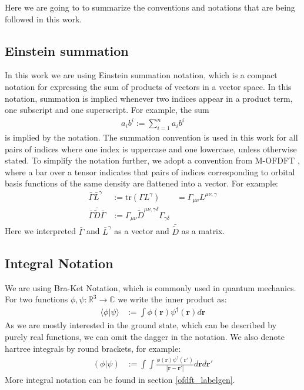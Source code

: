 Here we are going to to summarize the conventions and notations that are being followed in this work.
\subsection{Einstein summation}
In this work we are using Einstein summation notation, which is a compact notation for expressing the sum of products of vectors in a vector space. In this notation, summation is implied whenever two indices appear in a product term, one subscript and one superscript. For example, the sum
\begin{align}
    a_i b^i := \sum_{i=1}^n a_i b^i
\end{align}
is implied by the notation. The summation convention is used in this work for all pairs of indices where one index is uppercase and one lowercase, unless otherwise stated.
To simplify the notation further, we adopt a convention from \textsc{M-OFDFT} \cite{zhang_m-ofdft_2023}, where a bar over a tensor indicates that pairs of indices corresponding to orbital basis functions of the same density are flattened into a vector. For example:
\begin{align}
    \bar\Gamma\bar L^{\gamma}&:=\text{tr}(\Gamma L^{\gamma})&=\Gamma_{\mu\nu}L^{\mu\nu,\gamma}\\
    \bar\Gamma\bar {\tilde  D}\bar\Gamma &:= \Gamma_{\mu\nu}\tilde D^{\mu\nu,\gamma\delta}\Gamma_{\gamma\delta}
\end{align}
Here we interpreted $\bar\Gamma$ and $\bar L^{\gamma}$ as a vector and $\bar{\tilde D}$ as a matrix.
\subsection{Integral Notation}\label{integral_notation}
We are using Bra-Ket Notation, which is commonly used in quantum mechanics. For two functions $\phi,\psi:\mathbb{R}^3\rightarrow \mathbb{C}$ we write the inner product as:
\begin{align}
    \langle \phi | \psi\rangle &:= \int \phi(\mathbf r)\psi^\dagger(\mathbf r) d\mathbf r
\end{align}
As we are mostly interested in the ground state, which can be described by purely real functions, we can omit the dagger in the notation.
We also denote hartree integrals by round brackets, for example:
\begin{align}
    (\phi | \psi) &:= \int \int \frac{\phi(\mathbf r)\psi^\dagger(\mathbf r')}{|\mathbf{r}-\mathbf{r'}|} d\mathbf rd\mathbf {r'}
\end{align}
More integral notation can be found in section \ref{ofdft_labelgen}.
